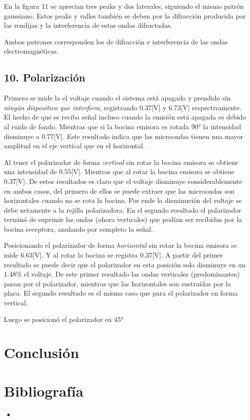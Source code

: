 \documentclass[a4paper,twocolumn,10pt]{article}
\begin{document}
En la figura 11 se aprecian tres peaks y dos laterales, siguiendo el mismo patrón gaussiano. Estos peaks y valles también se deben por la difracción producida por las rendijas y la interferencia de estas ondas difractadas.

Ambos patrones corresponden los de difracción e interferencia de las ondas electromagnéticas.



\subsection*{10. Polarización}
Primero se mide la el voltaje cuando el sistema está apagado y prendido sin \textit{ningún dispositivo que interfiera}, registrando 0.37[V] y 6.73[V] respectivamente. El hecho de que se reciba señal incluso cuando la emisión está apagada es debido al ruido de fondo. Mientras que si la bocina emisora es rotada 90° la intensidad disminuye a 0.77[V]. Este resultado indica que las microondas tienen una mayor amplitud en el eje vertical que en el horizontal.

Al tener el polarizador de forma \textit{vertical} sin rotar la bocina emisora se obtiene una intensidad de 0.55[V]. Mientras que al rotar la bocina emisora se obtiene 0.37[V]. De estos resultados es claro que el voltaje disminuye considerablemente en ambos casos, del primero de ellos se puede extraer que las microondas son horizontales cuando no se rota la bocina. Por ende la disminución del voltaje se debe netamente a la rejilla polarizadora. En el segundo resultado el polarizador terminó de suprimir las ondas (ahora verticales) que podían ser recibidas por la bocina receptora, anulando por completo la señal.

Posicionando el polarizador de forma \textit{horizontal} sin rotar la bocina emisora se mide 6.63[V]. Y al rotar la bocina se registra 0.37[V]. A partir del primer resultado se puede decir que el polarizador en esta posición solo disminuye en un $1.48\%$ el voltaje.
De este primer resultado las ondas verticales (predominantes) pasan por el polarizador, mientras que las horizontales son sustraídas por la placa.
El segundo resultado es el mismo caso que para el polarizador en forma vertical.

Luego se posicionó el polarizador en 45° 


\section{Conclusión}

\newpage
\section{Bibliografía}


\begin{itemize}
\item
\end{itemize}
\end{document}
